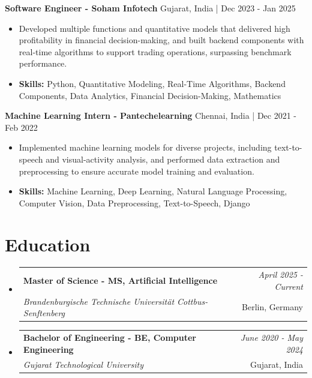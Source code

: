 \documentclass[a4paper,11pt]{article}
\makeatletter
\newcommand{\resumeSubheading}[4]{
\vspace{0.5mm}\item
    \begin{tabular*}{\linewidth}[t]{l@{\extracolsep{\fill}}r}
        \textbf{#1} & \textit{\footnotesize{#4}} \\
        \textit{\footnotesize{#3}} &  \footnotesize{#2}\\
    \end{tabular*}
    \vspace{-2.4mm}
}
\makeatother
\begin{document}
\vspace{1mm}
  \textbf{Software Engineer - Soham Infotech} \hfill Gujarat, India | Dec 2023 - Jan 2025
\vspace{-1.5mm} %
\begin{itemize}
  \item Developed multiple functions and quantitative models that delivered high profitability in financial decision-making, and built backend components with real-time algorithms to support trading operations, surpassing benchmark performance.

\vspace{-2mm}
  \item \textbf{Skills:} Python, Quantitative Modeling, Real-Time Algorithms, Backend Components, Data Analytics, Financial Decision-Making, Mathematics
\end{itemize}

\vspace{1mm}
  \textbf{Machine Learning Intern - Pantechelearning} \hfill Chennai, India | Dec 2021 - Feb 2022
\vspace{-1.5mm} %
\begin{itemize}
  \item Implemented machine learning models for diverse projects, including text-to-speech and visual-activity analysis, and performed data extraction and preprocessing to ensure accurate model training and evaluation.
\vspace{-2mm}
  \item \textbf{Skills:} Machine Learning, Deep Learning, Natural Language Processing, Computer Vision, Data Preprocessing, Text-to-Speech, Django
\end{itemize}\section{\textbf{Education}}
\vspace{-0.4mm}

\begin{itemize}[leftmargin=0.15in, label={}]
\resumeSubheading
{Master of Science - MS, Artificial Intelligence }{Berlin, Germany}
{Brandenburgische Technische Universität Cottbus-Senftenberg  }{April 2025 - Current}

\vspace{1.0mm} %
\resumeSubheading
{Bachelor of Engineering - BE, Computer Engineering  }{Gujarat, India}
{Gujarat Technological University }{June 2020 - May 2024}

\end{itemize}
\end{document}
